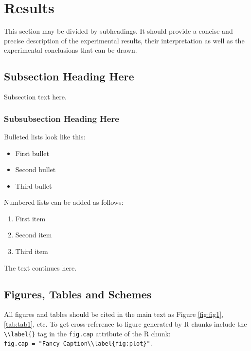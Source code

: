 \documentclass[notspecified,article,submit,moreauthors,pdftex]{Definitions/mdpi}
\providecommand{\tightlist}{%
  \setlength{\itemsep}{0pt}\setlength{\parskip}{0pt}}
\begin{document}
\hypertarget{results}{%
\section{Results}\label{results}}

This section may be divided by subheadings. It should provide a concise
and precise description of the experimental results, their
interpretation as well as the experimental conclusions that can be
drawn.

\hypertarget{subsection-heading-here}{%
\subsection{Subsection Heading Here}\label{subsection-heading-here}}

Subsection text here.

\hypertarget{subsubsection-heading-here}{%
\subsubsection{Subsubsection Heading
Here}\label{subsubsection-heading-here}}

Bulleted lists look like this:

\begin{itemize}
\tightlist
\item
  First bullet
\item
  Second bullet
\item
  Third bullet
\end{itemize}

Numbered lists can be added as follows:

\begin{enumerate}
\def\labelenumi{\arabic{enumi}.}
\tightlist
\item
  First item
\item
  Second item
\item
  Third item
\end{enumerate}

The text continues here.

\hypertarget{figures-tables-and-schemes}{%
\subsection{Figures, Tables and
Schemes}\label{figures-tables-and-schemes}}

All figures and tables should be cited in the main text as Figure
\ref{fig:fig1}, \ref{tab:tab1}, etc. To get cross-reference to figure
generated by R chunks include the
\texttt{\textbackslash{}\textbackslash{}label\{\}} tag in the
\texttt{fig.cap} attribute of the R chunk:
\texttt{fig.cap\ =\ "Fancy\ Caption\textbackslash{}\textbackslash{}label\{fig:plot\}"}.
\end{document}
